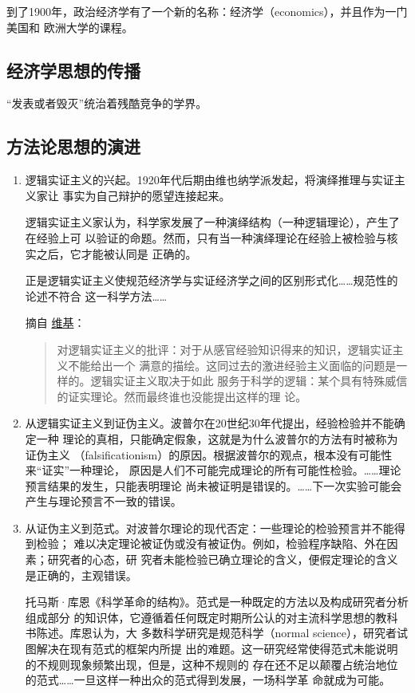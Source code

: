 到了1900年，政治经济学有了一个新的名称：经济学（economics），并且作为一门美国和
欧洲大学的课程。

\subsection{经济学思想的传播}

“发表或者毁灭”统治着残酷竞争的学界。

\subsection{方法论思想的演进}

\begin{enumerate}
\item 逻辑实证主义的兴起。1920年代后期由维也纳学派发起，将演绎推理与实证主义家让
  事实为自己辩护的愿望连接起来。

  逻辑实证主义家认为，科学家发展了一种演绎结构（一种逻辑理论），产生了在经验上可
  以验证的命题。然而，只有当一种演绎理论在经验上被检验与核实之后，它才能被认同是
  正确的。

  正是逻辑实证主义使规范经济学与实证经济学之间的区别形式化……规范性的论述不符合
  这一科学方法……

摘自
\href{https://zh.wikipedia.org/wiki/%E9%80%BB%E8%BE%91%E5%AE%9E%E8%AF%81%E4%B8%BB%E4%B9%89}{维基}：
  \begin{quotation}
    对逻辑实证主义的批评：对于从感官经验知识得来的知识，逻辑实证主义不能给出一个
    满意的描绘。这同过去的激进经验主义面临的问题是一样的。逻辑实证主义取决于如此
    服务于科学的逻辑：某个具有特殊威信的证实理论。然而最终谁也没能提出这样的理
    论。
  \end{quotation}


\item 从逻辑实证主义到证伪主义。波普尔在20世纪30年代提出，经验检验并不能确定一种
  理论的真相，只能确定假象，这就是为什么波普尔的方法有时被称为证伪主义
  （falsificationism）的原因。根据波普尔的观点，根本没有可能性来“证实”一种理论，
  原因是人们不可能完成理论的所有可能性检验。……理论预言结果的发生，只能表明理论
  尚未被证明是错误的。……下一次实验可能会产生与理论预言不一致的错误。

\item 从证伪主义到范式。对波普尔理论的现代否定：一些理论的检验预言并不能得到检验；
  难以决定理论被证伪或没有被证伪。例如，检验程序缺陷、外在因素；研究者的心态，研
  究者未能检验已确立理论的含义，便假定理论的含义是正确的，主观错误。

  托马斯·库恩《科学革命的结构》。范式是一种既定的方法以及构成研究者分析组成部分
  的知识体，它遵循着任何既定时期所公认的对主流科学思想的教科书陈述。库恩认为，大
  多数科学研究是规范科学（normal science），研究者试图解决在现有范式的框架内所提
  出的难题。这一研究经常使得范式未能说明的不规则现象频繁出现，但是，这种不规则的
  存在还不足以颠覆占统治地位的范式……一旦这样一种出众的范式得到发展，一场科学革
  命就成为可能。


\end{enumerate}
